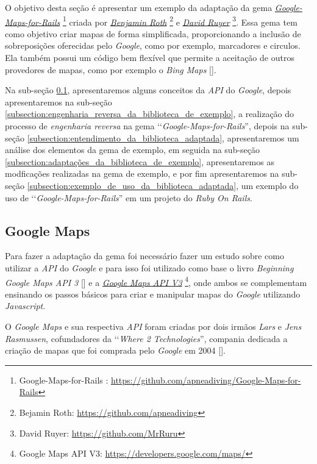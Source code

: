 O objetivo desta seção é apresentar um exemplo da adaptação da gema
\emph{\href{https://github.com/apneadiving/Google-Maps-for-Rails}{Google-Maps-for-Rails}} 
\footnote{Google-Maps-for-Rails : \url{https://github.com/apneadiving/Google-Maps-for-Rails}} criada por 
\emph{\href{https://github.com/apneadiving}{Benjamin Roth}} 
\footnote{Bejamin Roth: \url{https://github.com/apneadiving}} e 
\emph{\href{https://github.com/MrRuru}{David Ruyer}} \footnote{David Ruyer: \url{https://github.com/MrRuru}}.
Essa gema tem como objetivo criar mapas de forma simplificada, proporcionando a inclusão de
sobreposições oferecidas pelo \emph{Google}, como por exemplo, marcadores e circulos. Ela também possui
um código bem flexível que permite a aceitação de outros provedores de mapas, como por exemplo o
\emph{Bing Maps} [].

Na sub-seção \ref{subsection:google_maps}, apresentaremos alguns conceitos da \emph{API} do
\emph{Google}, depois apresentaremos na sub-seção \ref{subsection:engenharia_reversa_da_biblioteca_de_exemplo},
a realização do processo de \emph{engenharia reversa} na gema ‘‘\emph{Google-Maps-for-Rails}'', depois na
sub-seção \ref{subsection:entendimento_da_biblioteca_adaptada}, apresentaremos um análise dos elementos
da gema de exemplo, em seguida na sub-seção \ref{subsection:adaptações_da_biblioteca_de_exemplo},
apresentaremos as modficações realizadas na gema de exemplo, e por fim apresentaremos na sub-seção
\ref{subsection:exemplo_de_uso_da_biblioteca_adaptada}, um exemplo do uso de ‘‘\emph{Google-Maps-for-Rails}''
em um projeto do \emph{Ruby On Rails}.


\subsection{Google Maps}
\label{subsection:google_maps}


Para fazer a adaptação da gema foi necessário fazer um estudo sobre como utilizar a \emph{API} do 
\emph{Google} e para isso foi utilizado como base o livro \emph{Beginning Google Maps API 3} 
[] e a 
\emph{\href{https://developers.google.com/maps/}{Google Maps API V3}} 
\footnote{Google Maps API V3: \url{https://developers.google.com/maps/}}, onde ambos se complementam 
ensinando os passos básicos para criar e manipular mapas do \emph{Google} utilizando \emph{Javascript}. 

O \emph{Google Maps} e sua respectiva \emph{API} foram criadas por dois irmãos \emph{Lars} e 
\emph{Jens Rasmussen}, cofundadores da ‘‘\emph{Where 2 Technologies}'', compania dedicada a criação de mapas
que foi comprada pelo \emph{Google} em 2004 [].

